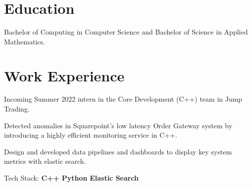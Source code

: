 \documentclass[]{Klement_Resume}
\begin{document}
%
%

%
%


\begin{minipage}[t]{1\textwidth} 


  \section{Education} 

  Bachelor of Computing in Computer Science and Bachelor of Science in Applied Mathematics.
  \sectionsep

    \section{Work Experience}
    \vspace{\topsep} %
    \begin{tightemize}
      \item Incoming Summer 2022 intern in the Core Development (C++) team in Jump Trading.
    \end{tightemize}
    \sectionsep

    \begin{tightemize}
    \item Detected anomalies in Squarepoint's low latency Order Gateway system by introducing a highly efficient monitoring service in C++.
    \item Design and developed data pipelines and dashboards to display key system metrics with elastic search.
    \item Tech Stack: {\bf C++} \textbullet{} {\bf Python} \textbullet{} {\bf Elastic Search}
    \end{tightemize}
    \sectionsep


\end{minipage}
\end{document}
